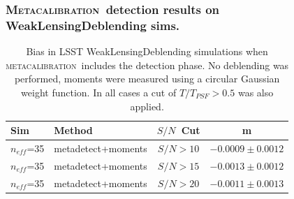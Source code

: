 \documentclass{beamer}
\newcommand{\mcal}{\textsc{metacalibration}}
\newcommand{\Mcal}{\textsc{Metacalibration}}
\newcommand{\snr}{$S/N$}
\newcommand{\neff}{$n_{eff}$}
\begin{document}
\begin{frame}
    \frametitle{\Mcal\ detection results on WeakLensingDeblending sims.}

 
    \begin{table}
        \centering
        \begin{tabular}{|l|l|c|c|}
            \hline
            Sim & Method         & \snr\ Cut & m             \\
            \hline

            \hline
            \neff={\color{brightred}35}    & metadetect+moments    & \snr$ > 10$ & $-0.0009 \pm 0.0012$  \\
            \neff={\color{brightred}35}    & metadetect+moments    & \snr$ > 15$ & $-0.0013 \pm 0.0012$  \\
            \neff={\color{brightred}35}    & metadetect+moments    & \snr$ > 20$ & $-0.0011 \pm 0.0013$  \\
            \hline

        \end{tabular}
        \caption{Bias in LSST WeakLensingDeblending simulations when \mcal\ includes
            the detection phase.  No deblending was performed, 
            moments were measured using a circular Gaussian weight function.
            In all cases a cut of $T/T_{PSF} > 0.5$ was also applied.
        \label{tab:mcal:deblending}}
    \end{table}


\end{frame}
\end{document}
